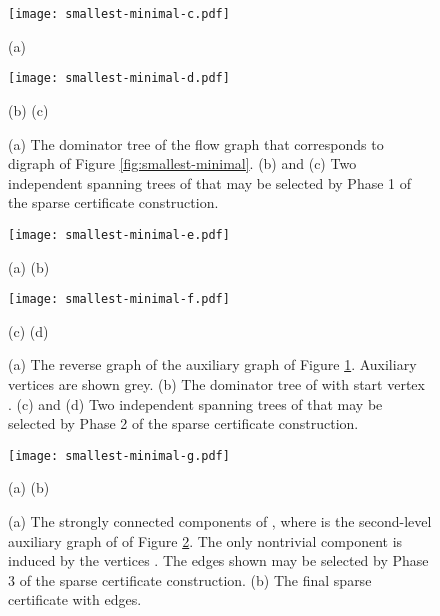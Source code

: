 \documentclass[11pt]{article}
\begin{document}
\begin{figure}[h!]
\begin{center}
\texttt{[image: smallest-minimal-c.pdf]}
\end{center}
\hspace{7.5cm} (a)
\begin{center}
\texttt{[image: smallest-minimal-d.pdf]}
\end{center}
\hspace{3.5cm} (b) \hspace{6.8cm} (c)
\caption{(a)  The dominator tree of the flow graph  that corresponds to digraph  of Figure \ref{fig:smallest-minimal}. (b) and (c) Two independent spanning trees of  that may be selected by Phase 1 of the sparse certificate construction.}
\label{fig:smallest-minimal-2}
\end{figure}

\begin{figure}[h!]
\begin{center}
\texttt{[image: smallest-minimal-e.pdf]}
\end{center}
\vspace{-0.2cm}
\hspace{4cm} (a) \hspace{7cm} (b)
\vspace{0.2cm}
\begin{center}
\texttt{[image: smallest-minimal-f.pdf]}
\end{center}
\hspace{4cm} (c) \hspace{7cm} (d)
\vspace{-0.2cm}
\caption{(a) The reverse graph  of the auxiliary graph  of Figure \ref{fig:smallest-minimal-2}. Auxiliary vertices are shown grey. (b) The dominator tree of  with start vertex .
 (c) and (d)  Two independent spanning trees of  that may be selected by Phase 2 of the sparse certificate construction.
}
\label{fig:smallest-minimal-3}
\end{figure}

\begin{figure}[h!]
\begin{center}
\texttt{[image: smallest-minimal-g.pdf]}
\end{center}
\hspace{4cm} (a) \hspace{6.2cm} (b)
\caption{(a) The strongly connected components of , where  is the second-level auxiliary graph of  of Figure \ref{fig:smallest-minimal-3}. The only nontrivial component is induced by the vertices . The edges shown may be  selected by Phase 3 of the sparse certificate construction. (b) The final sparse certificate with  edges.}
\label{fig:smallest-minimal-4}
\end{figure}
\end{document}
